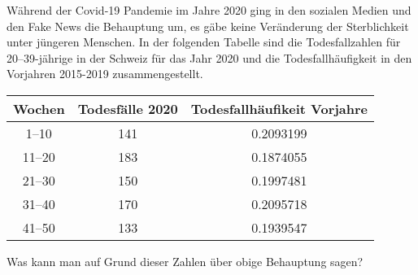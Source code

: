 Während der Covid-19 Pandemie im Jahre 2020 ging in den sozialen Medien
und den Fake News die Behauptung um, es gäbe keine Veränderung der
Sterblichkeit unter jüngeren Menschen.
In der folgenden Tabelle sind die Todesfallzahlen für
20--39-jährige in der Schweiz für
das Jahr 2020 und die Todesfallhäufigkeit in den Vorjahren 2015-2019
zusammengestellt.
\begin{center}
\begin{tabular}{|c|c|c|}
\hline
Wochen         &Todesfälle 2020&Todesfallhäufikeit Vorjahre\\
\hline
\phantom{0}1--10&            141&         0.2093199 \\
          11--20&            183&         0.1874055 \\
          21--30&            150&         0.1997481 \\
          31--40&            170&         0.2095718 \\
          41--50&            133&         0.1939547 \\
\hline
\end{tabular}
\end{center}
Was kann man auf Grund dieser Zahlen über obige Behauptung sagen?


